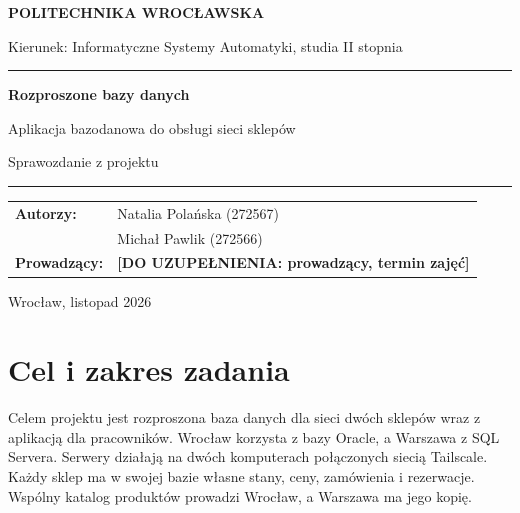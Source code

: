 \documentclass[11pt,a4paper]{article}
\newcommand{\douzup}[1]{\textcolor{red!75!black}{\textbf{[DO UZUPEŁNIENIA: #1]}}}
\begin{document}
\begin{titlepage}
\centering
\vspace*{1.5cm}
{\large\bfseries POLITECHNIKA WROCŁAWSKA\par}
\vspace{0.3cm}
{\normalsize Kierunek: Informatyczne Systemy Automatyki, studia II stopnia\par}

\vspace{4cm}
{\color{akcent}\rule{0.6\textwidth}{0.8pt}\par}
\vspace{0.6cm}
{\Huge\bfseries\color{akcent} Rozproszone bazy danych\par}
\vspace{0.6cm}
{\LARGE Aplikacja bazodanowa do obsługi sieci sklepów\par}
\vspace{0.4cm}
{\large Sprawozdanie z projektu\par}
\vspace{0.6cm}
{\color{akcent}\rule{0.6\textwidth}{0.8pt}\par}

\vfill
\begin{tabular}{@{}ll@{}}
\textbf{Autorzy:}    & Natalia Polańska (272567) \\
                     & Michał Pawlik (272566) \\[4pt]
\textbf{Prowadzący:} & \douzup{prowadzący, termin zajęć} \\
\end{tabular}

\vspace{1.5cm}
{\small Wrocław, listopad 2026\par}
\end{titlepage}

\section{Cel i zakres zadania}
Celem projektu jest rozproszona baza danych dla sieci dwóch sklepów wraz
z aplikacją dla pracowników. Wrocław korzysta z bazy Oracle, a Warszawa
z SQL Servera. Serwery działają na dwóch komputerach połączonych siecią Tailscale.
Każdy sklep ma w swojej bazie własne stany, ceny, zamówienia i rezerwacje.
Wspólny katalog produktów prowadzi Wrocław, a Warszawa ma jego kopię.
\end{document}
